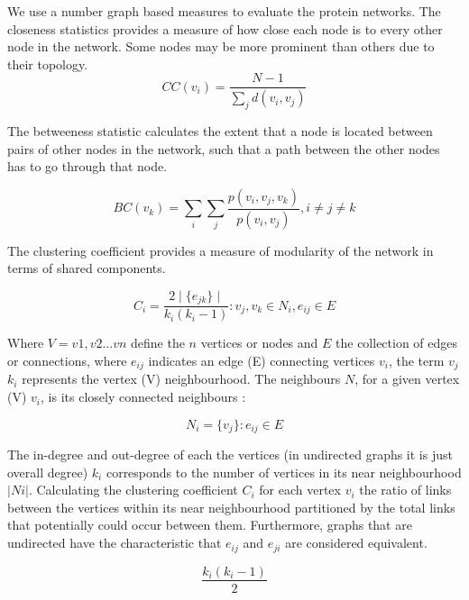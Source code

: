\documentclass[preprint,11pt]{elsarticle}
\begin{document}
We use a number graph based measures to evaluate the protein networks. %
The closeness statistics provides a measure of how close each node is to every other node in the network. Some nodes may be more prominent than others due to their topology.
\begin{equation}\label{closeness}
     CC(v_i) =  \frac{N - 1}{\sum_{j} d(v_i,v_j)}
\end{equation}

The betweeness statistic calculates the extent that a node is located between pairs of other nodes in the network, such that a path between the other nodes has to go through that node.

\begin{equation}\label{betweenness}
     BC (v_k) =  \sum_{i} \sum_{j} \frac{p(v_i,v_j,v_k)}{p(v_i,v_j)}, i \neq j \neq k
\end{equation}

The clustering coefficient provides a measure of modularity of the network in terms of shared components.

\begin{equation}\label{clustercoeff}
     C_{i}  =  \frac{2\mid\{e_{jk} \}\mid}{k_{i}(k_{i} - 1)} : v_{j}, v_{k} \in N_{i}, e_{ij} \in E
\end{equation}

Where $V = v1, v2  ... vn$ define the $n$ vertices or nodes and $E$ the collection of edges or connections, where $e_{ij}$ indicates an edge (E) connecting vertices $v_i$, the term $v_j$ $k_i$ represents the vertex (V) neighbourhood. The neighbours $N$, for a given vertex (V) $v_i$, is its closely connected neighbours :

\begin{equation}\label{neighbour}
     N_{i}  =  \{v_{j}\}:e_{ij} \in E
\end{equation}

The in-degree and out-degree of each the vertices (in undirected graphs it is just overall degree) $k_i$  corresponds to the number of vertices in its near neighbourhood $| Ni |$.  Calculating the clustering coefficient $C_i$ for each vertex $v_i$ the ratio of links between the vertices within its near neighbourhood partitioned by the total  links that potentially could occur between them. Furthermore, graphs that are undirected have the characteristic that $e_{ij}$ and $e_{ji}$ are considered equivalent. 

\begin{equation}\label{edges}
    \frac{k_{i}(k_{i} - 1)}{2}
\end{equation}
\end{document}
